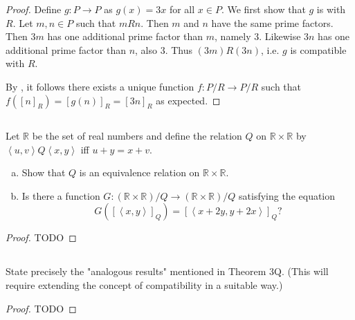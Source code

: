 \documentclass{report}
\newcommand{\pair}[1]{\left< #1 \right>}
\begin{document}
\begin{proof}

  Define $g \colon P \rightarrow P$ as $g(x) = 3x$ for all $x \in P$.
  We first show that $g$ is  with $R$.
  Let $m, n \in P$ such that $mRn$.
  Then $m$ and $n$ have the same prime factors.
  Then $3m$ has one additional prime factor than $m$, namely $3$.
  Likewise $3n$ has one additional prime factor than $n$, also $3$.
  Thus $(3m)R(3n)$, i.e. $g$ is compatible with $R$.

  By , it follows there exists a unique function
    $f \colon P / R \rightarrow P / R$ such that $f([n]_R) = [g(n)]_R = [3n]_R$
    as expected.

\end{proof}

\subsection{}%

Let $\mathbb{R}$ be the set of real numbers and define the relation $Q$ on
  $\mathbb{R} \times \mathbb{R}$ by $\pair{u, v}Q\pair{x, y}$ iff
  $u + y = x + v$.

\begin{enumerate}[(a)]
  \item Show that $Q$ is an equivalence relation on
    $\mathbb{R} \times \mathbb{R}$.
  \item Is there a function $G \colon (\mathbb{R} \times \mathbb{R}) / Q
    \rightarrow (\mathbb{R} \times \mathbb{R}) / Q$ satisfying the equation
    $$G([\pair{x, y}]_Q) = [\pair{x + 2y, y + 2x}]_Q?$$

\end{enumerate}

\begin{proof}

  TODO

\end{proof}

\subsection{}%

State precisely the "analogous results" mentioned in Theorem 3Q.
(This will require extending the concept of compatibility in a suitable way.)

\begin{proof}

  TODO

\end{proof}
\end{document}
